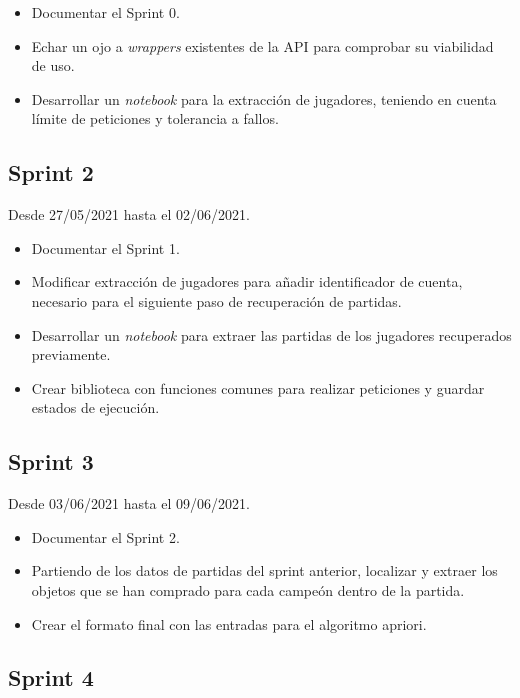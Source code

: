 \begin{itemize}
    \item Documentar el Sprint 0.
    \item Echar un ojo a \textit{wrappers} existentes de la API para comprobar su viabilidad de uso.
    \item Desarrollar un \textit{notebook} para la extracción de jugadores, teniendo en cuenta límite de peticiones y tolerancia a fallos.
\end{itemize}

\subsection{Sprint 2}

Desde 27/05/2021 hasta el 02/06/2021.

\begin{itemize}
    \item Documentar el Sprint 1.
    \item Modificar extracción de jugadores para añadir identificador de cuenta, necesario para el siguiente paso de recuperación de partidas.
    \item Desarrollar un \textit{notebook} para extraer las partidas de los jugadores recuperados previamente.
    \item Crear biblioteca con funciones comunes para realizar peticiones y guardar estados de ejecución.
\end{itemize}

\subsection{Sprint 3}

Desde 03/06/2021 hasta el 09/06/2021.

\begin{itemize}
    \item Documentar el Sprint 2.
    \item Partiendo de los datos de partidas del sprint anterior, localizar y extraer los objetos que se han comprado para cada campeón dentro de la partida.
    \item Crear el formato final con las entradas para el algoritmo apriori.
\end{itemize}

\subsection{Sprint 4}

